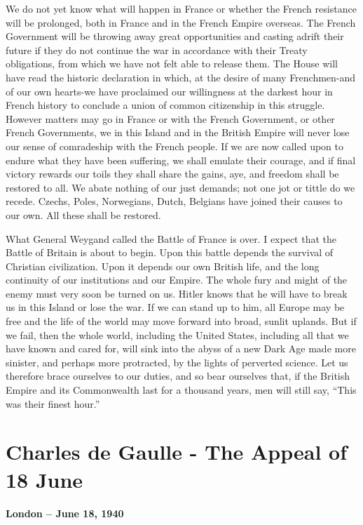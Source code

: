 \documentclass[a4paper]{amsbook}
\begin{document}
We do not yet know what will happen in France or whether the French resistance will be prolonged, both in France and in the French Empire overseas. The French Government will be throwing away great opportunities and casting adrift their future if they do not continue the war in accordance with their Treaty obligations, from which we have not felt able to release them. The House will have read the historic declaration in which, at the desire of many Frenchmen-and of our own hearts-we have proclaimed our willingness at the darkest hour in French history to conclude a union of common citizenship in this struggle. However matters may go in France or with the French Government, or other French Governments, we in this Island and in the British Empire will never lose our sense of comradeship with the French people. If we are now called upon to endure what they have been suffering, we shall emulate their courage, and if final victory rewards our toils they shall share the gains, aye, and freedom shall be restored to all. We abate nothing of our just demands; not one jot or tittle do we recede. Czechs, Poles, Norwegians, Dutch, Belgians have joined their causes to our own. All these shall be restored.

What General Weygand called the Battle of France is over. I expect that the Battle of Britain is about to begin. Upon this battle depends the survival of Christian civilization. Upon it depends our own British life, and the long continuity of our institutions and our Empire. The whole fury and might of the enemy must very soon be turned on us. Hitler knows that he will have to break us in this Island or lose the war. If we can stand up to him, all Europe may be free and the life of the world may move forward into broad, sunlit uplands. But if we fail, then the whole world, including the United States, including all that we have known and cared for, will sink into the abyss of a new Dark Age made more sinister, and perhaps more protracted, by the lights of perverted science. Let us therefore brace ourselves to our duties, and so bear ourselves that, if the British Empire and its Commonwealth last for a thousand years, men will still say, “This was their finest hour.”


\chapter{Charles de Gaulle - The Appeal of 18 June}

\textbf{\Large{London -- June 18, 1940 }}
\end{document}
